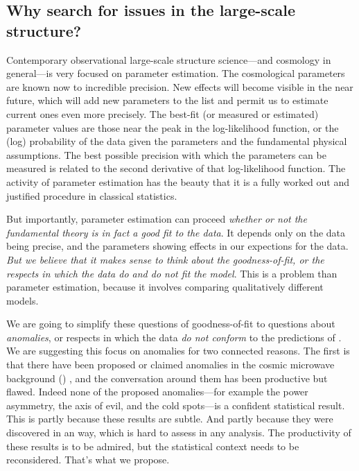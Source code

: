 \documentclass[12pt, fullpage, letterpaper]{article}
\begin{document}
\subsection{Why search for issues in the large-scale structure?}

Contemporary observational large-scale structure science---and
cosmology in general---is very focused on parameter estimation.
The cosmological parameters are known now to incredible precision.
New effects will become visible in the near future, which will add
new parameters to the list and permit us to estimate current
ones even more precisely.
The best-fit (or measured or estimated) parameter values are those near
the peak in the log-likelihood function, or the
(log) probability of the data given the parameters and the fundamental
physical assumptions.
The best possible precision with which the parameters can be measured
is related to the second derivative of that log-likelihood function.
The activity of parameter estimation has the beauty that it is a fully
worked out and justified procedure in classical statistics.

But importantly,
parameter estimation can proceed \emph{whether or not the fundamental theory
is in fact a good fit to the data}.
It depends only on the data being precise, and the parameters showing
effects in our expections for the data.
\emph{But we believe that it makes sense to think about the goodness-of-fit,
or the respects in which the data do and do not fit the model}.
This is a problem than parameter estimation, because it involves comparing qualitatively different models.

We are going to simplify these questions of goodness-of-fit to questions about
\emph{anomalies}, or respects in which the data \emph{do not conform}
to the predictions of \LCDM.
We are suggesting this focus on anomalies for two connected reasons.
The first is that there have been proposed or claimed anomalies in the
cosmic microwave background (\CMB) \citep{Huterer2010}, and the conversation around them has been
productive but flawed.
Indeed none of the proposed anomalies---for example the power
asymmetry, the axis of evil, and the cold
spots---is a confident statistical result.
This is partly because these results are subtle.
And partly because they were discovered in an  way, which is hard to
assess in any  analysis.
The productivity of these results is to be admired, but the statistical
context needs to be reconsidered.
That's what we propose.
\end{document}
